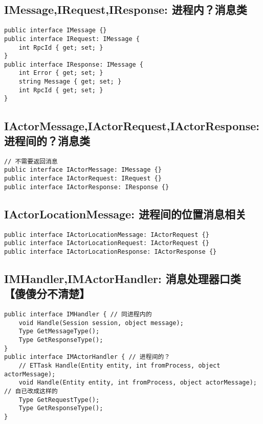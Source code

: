 \documentclass[9pt, b5paper]{article}
\begin{document}
\subsection{IMessage,IRequest,IResponse: 进程内？消息类}
\label{sec-2-1}
\begin{verbatim}
public interface IMessage {}
public interface IRequest: IMessage {
    int RpcId { get; set; }
}
public interface IResponse: IMessage {
    int Error { get; set; }
    string Message { get; set; }
    int RpcId { get; set; }
}
\end{verbatim}
\subsection{IActorMessage,IActorRequest,IActorResponse: 进程间的？消息类}
\label{sec-2-2}
\begin{verbatim}
// 不需要返回消息
public interface IActorMessage: IMessage {}
public interface IActorRequest: IRequest {}
public interface IActorResponse: IResponse {}
\end{verbatim}
\subsection{IActorLocationMessage: 进程间的位置消息相关}
\label{sec-2-3}
\begin{verbatim}
public interface IActorLocationMessage: IActorRequest {}
public interface IActorLocationRequest: IActorRequest {}
public interface IActorLocationResponse: IActorResponse {}
\end{verbatim}
\subsection{IMHandler,IMActorHandler: 消息处理器口类【傻傻分不清楚】}
\label{sec-2-4}
\begin{verbatim}
public interface IMHandler { // 同进程内的
    void Handle(Session session, object message);
    Type GetMessageType();
    Type GetResponseType();
}
public interface IMActorHandler { // 进程间的？
    // ETTask Handle(Entity entity, int fromProcess, object actorMessage);
    void Handle(Entity entity, int fromProcess, object actorMessage); // 自已改成这样的
    Type GetRequestType();
    Type GetResponseType();
}
\end{verbatim}
\end{document}
